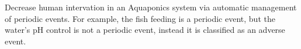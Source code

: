 Decrease human intervation in an Aquaponics system via automatic management of periodic events.
For example, the fish feeding is a periodic event,
but the water's pH control is not a periodic event,
instead it is classified as an adverse event.
